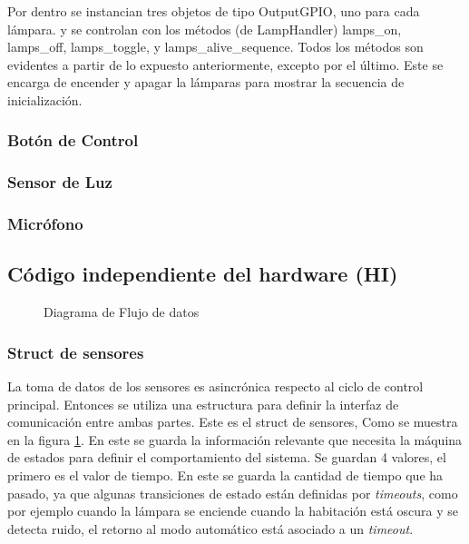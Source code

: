 Por dentro se instancian tres objetos de tipo OutputGPIO, uno para cada lámpara. y se controlan con
los métodos (de LampHandler) lamps\_on, lamps\_off, lamps\_toggle, y lamps\_alive\_sequence. Todos los
métodos son evidentes a partir de lo expuesto anteriormente, excepto por el último. Este se encarga
de encender y apagar la lámparas para mostrar la secuencia de inicialización. 

\subsubsection{Botón de Control}

\subsubsection{Sensor de Luz}
\subsubsection{Micrófono}




\subsection{Código independiente del hardware (HI)}

\begin{figure}
\centering
\scalebox{.5}{}
\caption{Diagrama de Flujo de datos}
\label{fig:data_flow}
\end{figure}


\subsubsection{Struct de sensores}
La toma de datos de los sensores es asincrónica respecto al ciclo de control principal. Entonces se
utiliza una estructura para definir la interfaz de comunicación entre ambas partes. Este es el
struct de sensores, Como se muestra en la figura \ref{fig:data_flow}. En este se guarda la
información relevante que necesita la máquina de estados para definir el comportamiento del
sistema. Se guardan 4 valores, el primero es el valor de tiempo. En este se guarda la cantidad de
tiempo que ha pasado, ya que algunas transiciones de estado están definidas por \textit{timeouts},
como por ejemplo cuando la lámpara se enciende cuando la habitación está oscura y se detecta ruido,
el retorno al modo automático está asociado a un \textit{timeout}.

